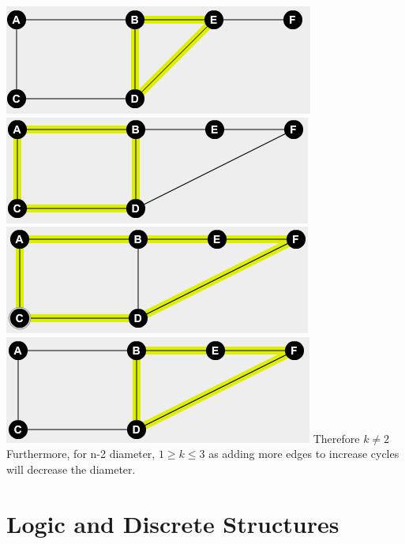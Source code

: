 \documentclass{article}
\begin{document}
	\newline
	\includegraphics{6Cycles9}
	\newline
	\newline
	\includegraphics{6Cycles10}
	\newline
	\includegraphics{6Cycles11}
	\newline
	\includegraphics{6Cycles12}
	\newline
	Therefore $k \neq 2$
	\newline
	Furthermore, for n-2 diameter, $ 1 \geq k \leq 3$ as adding more edges to increase cycles will decrease the diameter.

	\section{Logic and Discrete Structures}
\end{document}

